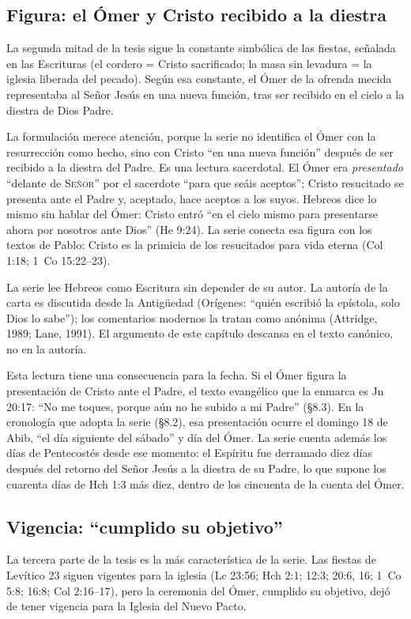 \documentclass[11pt,letterpaper]{article}
\newcommand{\SENOR}{\textsc{Señor}}
\begin{document}
\subsection{Figura: el Ómer y Cristo recibido a la diestra}
La segunda mitad de la tesis sigue la constante simbólica de las fiestas, señalada en las Escrituras (el cordero = Cristo sacrificado; la masa sin levadura = la iglesia liberada del pecado). Según esa constante, el Ómer de la ofrenda mecida representaba al Señor Jesús en una nueva función, tras ser recibido en el cielo a la diestra de Dios Padre.

La formulación merece atención, porque la serie no identifica el Ómer con la resurrección como hecho, sino con Cristo ``en una nueva función'' después de ser recibido a la diestra del Padre. Es una lectura sacerdotal. El Ómer era \emph{presentado} ``delante de \SENOR'' por el sacerdote ``para que seáis aceptos''; Cristo resucitado se presenta ante el Padre y, aceptado, hace aceptos a los suyos. Hebreos dice lo mismo sin hablar del Ómer: Cristo entró ``en el cielo mismo para presentarse ahora por nosotros ante Dios'' (He 9:24). La serie conecta esa figura con los textos de Pablo: Cristo es la primicia de los resucitados para vida eterna (Col 1:18; 1~Co 15:22--23).

\begin{nota}
La serie lee Hebreos como Escritura sin depender de su autor. La autoría de la carta es discutida desde la Antigüedad (Orígenes: ``quién escribió la epístola, solo Dios lo sabe''); los comentarios modernos la tratan como anónima (Attridge, 1989; Lane, 1991). El argumento de este capítulo descansa en el texto canónico, no en la autoría.
\end{nota}

Esta lectura tiene una consecuencia para la fecha. Si el Ómer figura la presentación de Cristo ante el Padre, el texto evangélico que la enmarca es Jn 20:17: ``No me toques, porque aún no he subido a mi Padre'' (§8.3). En la cronología que adopta la serie (§8.2), esa presentación ocurre el domingo 18 de Abib, ``el día siguiente del sábado'' y día del Ómer. La serie cuenta además los días de Pentecostés desde ese momento: el Espíritu fue derramado diez días después del retorno del Señor Jesús a la diestra de su Padre, lo que supone los cuarenta días de Hch 1:3 más diez, dentro de los cincuenta de la cuenta del Ómer.

\subsection{Vigencia: ``cumplido su objetivo''}
La tercera parte de la tesis es la más característica de la serie. Las fiestas de Levítico 23 siguen vigentes para la iglesia (Lc 23:56; Hch 2:1; 12:3; 20:6, 16; 1~Co 5:8; 16:8; Col 2:16--17), pero la ceremonia del Ómer, cumplido su objetivo, dejó de tener vigencia para la Iglesia del Nuevo Pacto.
\end{document}
